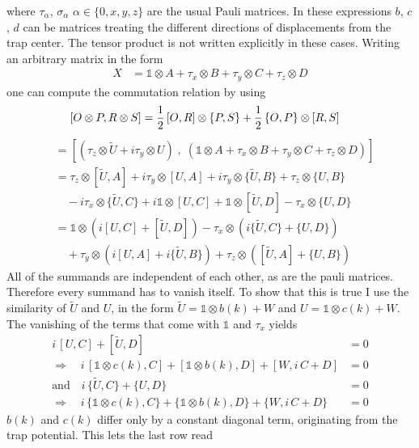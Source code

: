 where $\tau_\alpha$, $\sigma_\alpha$ $\alpha\in\{0,x,y,z\}$ are the usual Pauli matrices. In these expressions $b$, $c$, $d$ can be matrices treating the different directions of displacements from the trap center. The tensor product is not written explicitly in these cases.
Writing an arbitrary matrix in the form
\begin{align*}
    X&= \mathbb{1}\otimes A + \tau_x \otimes B + \tau_y \otimes C + \tau_z \otimes D
\end{align*}
one can compute the commutation relation by using
\begin{align*}
    \left[ O\otimes P, R\otimes S \right]&=\frac{1}{2} \,[O,R]\otimes \{P,S\}+ \frac{1}{2}\,\{O,P\}\otimes [R,S]
\end{align*}
\begin{align*}
    [H_k,X]&= \left[\left( \tau_z \otimes \tilde{U} + i \tau_y\otimes U\right)\;,\; \left(\mathbb{1} \otimes A + \tau_x \otimes B + \tau_y \otimes C + \tau_z \otimes D \right)\right] \\
&= \tau_z \otimes [\tilde{U}, A] + i \tau_y \otimes [U, A] + i \tau_y \otimes \{\tilde{U}, B\} + \tau_z \otimes \{U, B\} \\
&\quad - i \tau_x \otimes \{\tilde{U}, C\} + i \mathbb{1} \otimes [U, C] + \mathbb{1} \otimes [\tilde{U}, D] - \tau_x \otimes \{U, D\} \\
&= \mathbb{1} \otimes ( i[U, C] + [\tilde{U}, D] ) - \tau_x \otimes ( i\{\tilde{U}, C\} + \{U, D\} ) \\
&\quad + \tau_y \otimes ( i[U, A] + i\{\tilde{U}, B\} ) + \tau_z \otimes ( [\tilde{U}, A] + \{U, B\} )
\end{align*}
All of the summands are independent of each other, as are the pauli matrices. Therefore every summand has to vanish itself. To show that this is true I use the similarity of $\tilde{U}$ and $U$, in the form $\tilde{U}=\mathbb{1}\otimes b(k)+W$ and $U=\mathbb{1}\otimes c(k)+W$. The vanishing of the terms that come with $\mathbb{1}$ and $\tau_x$ yields 
\begin{align*}
    i\,[U,C] + [\tilde{U},D]&=0\\
    \Rightarrow\quad i\,[\mathbb{1}\otimes c(k),C]+ [\mathbb{1}\otimes b(k),D]+ [W,i\,C+D]&=0\\
    \text{and}\quad i\,\{\tilde{U}, C\} + \{U, D\}&=0\\
    \Rightarrow\quad i\,\{\mathbb{1}\otimes c(k),C\}+ \{\mathbb{1}\otimes b(k),D\}+\{W,i\,C+D\}&=0
\end{align*}
$b(k)$ and $c(k)$ differ only by a constant diagonal term, originating from the trap potential. This lets the last row read

